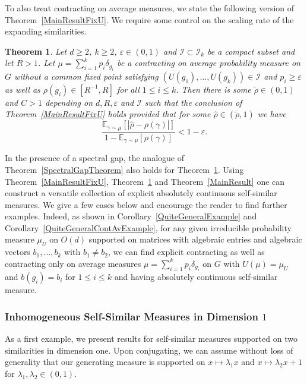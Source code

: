 \documentclass[10pt, english,oneside,reqno]{amsart}
\theoremstyle{plain}
\newtheorem{theorem}{Theorem}[section]
\theoremstyle{remark}
\numberwithin{equation}{section}
\numberwithin{figure}{section}
\newcommand{\eps}{\varepsilon}
\newcommand{\E}{\mathbb{E}}
\begin{document}
    To also treat contracting on average measures, we state the following version of Theorem~\ref{MainResultFixU}. We require some control on the scaling rate of the expanding similarities.

    \begin{theorem}\label{MainResultContAvFixU}
        Let $d\geq 2$, $k\geq 2$, $\eps \in (0,1)$ and $\mathcal{I} \subset \mathcal{I}_k$ be a compact subset and let $R > 1$. Let $\mu = \sum_{i = 1}^k p_i\delta_{g_i}$ be a contracting on average probability measure on $G$ without a common fixed point satisfying $(U(g_1), \ldots , U(g_k)) \in \mathcal{I}$ and $p_i \geq \eps$ as well as $\rho(g_i) \in [R^{-1},R]$ for all $1\leq i \leq k$. Then there is some $\tilde{\rho} \in (0,1)$ and $C > 1$ depending on $d,R, \eps$ and $\mathcal{I}$ such that the conclusion of Theorem~\ref{MainResultFixU} holds provided that for some $\hat{\rho} \in (\tilde{\rho},1)$ we have $$\frac{\E_{\gamma\sim \mu}[|\hat{\rho} - \rho(\gamma)|]}{1 - \E_{\gamma\sim\mu}[\rho(\gamma)]} < 1 - \varepsilon.$$ 
    \end{theorem}

    In the presence of a spectral gap, the analogue of Theorem~\ref{SpectralGapTheorem} also holds for Theorem~\ref{MainResultContAvFixU}. Using Theorem~\ref{MainResultFixU}, Theorem~\ref{MainResultContAvFixU} and Theorem~\ref{MainResult} one can construct a versatile collection of  explicit absolutely continuous self-similar measures. We give a few cases below and encourage the reader to find further examples.  Indeed, as shown in Corollary~\ref{QuiteGeneralExample} and Corollary~\ref{QuiteGeneralContAvExample}, for any given irreducible probability measure $\mu_U$ on $O(d)$ supported on matrices with algebraic entries and algebraic vectors $b_1, \ldots , b_k$ with $b_1 \neq b_2$, we can find explicit contracting as well as contracting only on average measures $\mu = \sum_{i = 1}^k p_i\delta_{g_i}$ on $G$ with $U(\mu) = \mu_U$ and $b(g_i) = b_i$ for $1 \leq i \leq k$ and having absolutely continuous self-similar measure. 

    \subsubsection*{\normalfont\textbf{Inhomogeneous Self-Similar Measures in Dimension $1$}}

    As a first example, we present results for self-similar measures supported on two similarities in dimension one. Upon conjugating, we can assume without loss of generality that our generating measure is supported on $x \mapsto \lambda_1x$ and $x \mapsto \lambda_2 x + 1$ for $\lambda_1, \lambda_2 \in (0,1)$.
\end{document}
